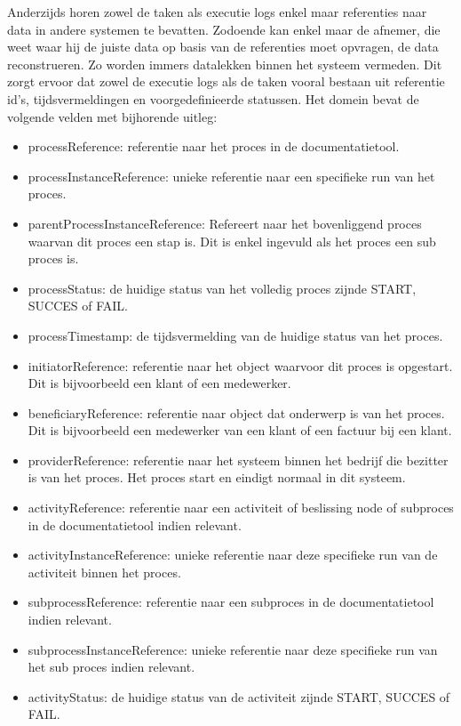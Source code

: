 Anderzijds horen zowel de taken als executie logs enkel maar referenties naar data in andere systemen te bevatten. Zodoende kan enkel maar de afnemer, die weet waar hij de juiste data op basis van de referenties moet opvragen, de data reconstrueren. Zo worden immers datalekken binnen het systeem vermeden. Dit zorgt ervoor dat zowel de executie logs als de taken vooral bestaan uit referentie id’s, tijdsvermeldingen en voorgedefinieerde statussen. Het domein bevat de volgende velden met bijhorende uitleg:
\begin{itemize}
  \item processReference: referentie naar het proces in de documentatietool.
  \item processInstanceReference: unieke referentie naar een specifieke run van het proces.
  \item parentProcessInstanceReference: Refereert naar het bovenliggend proces waarvan dit proces een stap is. Dit is enkel ingevuld als het proces een sub proces is.
  \item processStatus: de huidige status van het volledig proces zijnde START, SUCCES of FAIL.
  \item processTimestamp: de tijdsvermelding van de huidige status van het proces.
  \item initiatorReference: referentie naar het object waarvoor dit proces is opgestart. Dit is bijvoorbeeld een klant of een medewerker.
  \item beneficiaryReference: referentie naar object dat onderwerp is van het proces. Dit is bijvoorbeeld een medewerker van een klant of een factuur bij een klant.
  \item providerReference: referentie naar het systeem binnen het bedrijf die bezitter is van het proces. Het proces start en eindigt normaal in dit systeem.
  \item activityReference: referentie naar een activiteit of beslissing node of subproces in de documentatietool indien relevant.
  \item activityInstanceReference: unieke referentie naar deze specifieke run van de activiteit binnen het proces.
  \item subprocessReference: referentie naar een subproces in de documentatietool indien relevant.
  \item subprocessInstanceReference: unieke referentie naar deze specifieke run van het sub proces indien relevant.
  \item activityStatus: de huidige status van de activiteit zijnde START, SUCCES of FAIL.

\end{itemize}
